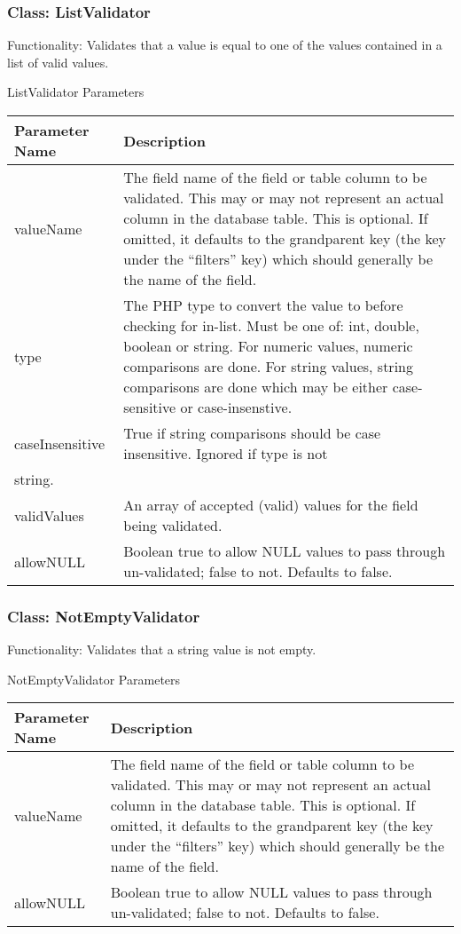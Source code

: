 \documentclass[letterpaper,10pt,english]{sphinxmanual}
\begin{document}
\subsubsection{Class: ListValidator}
\label{jaxFrameworkGuide:class-listvalidator}
Functionality: Validates that a value is equal to one of the values contained in a list of valid
values.

ListValidator Parameters

\begin{tabulary}{\linewidth}{|L|L|}
\hline
\textsf{\relax 
Parameter Name
} & \textsf{\relax 
Description
}\\
\hline
valueName
 & 
The field name of the field or table column to be validated.  This may or may not
represent an actual column in the database table.  This is optional.  If omitted, it
defaults to the grandparent key (the key under the ``filters'' key) which should
generally be the name of the field.
\\
\hline
type
 & 
The PHP type to convert the value to before checking for in-list.  Must be one of:
int, double, boolean or string.  For numeric values, numeric comparisons are done.
For string values, string comparisons are done which may be either case-sensitive or
case-insenstive.
\\
\hline
caseInsensitive
 & 
True if string comparisons should be case insensitive.  Ignored if type is not
\\
\hline
string.
 & \\
\hline
validValues
 & 
An array of accepted (valid) values for the field being validated.
\\
\hline
allowNULL
 & 
Boolean true to allow NULL values to pass through un-validated; false to not.
Defaults to false.
\\
\hline\end{tabulary}



\subsubsection{Class: NotEmptyValidator}
\label{jaxFrameworkGuide:class-notemptyvalidator}
Functionality: Validates that a string value is not empty.

NotEmptyValidator Parameters

\begin{tabulary}{\linewidth}{|L|L|}
\hline
\textsf{\relax 
Parameter Name
} & \textsf{\relax 
Description
}\\
\hline
valueName
 & 
The field name of the field or table column to be validated.  This may or may not
represent an actual column in the database table.  This is optional.  If omitted, it
defaults to the grandparent key (the key under the ``filters'' key) which should
generally be the name of the field.
\\
\hline
allowNULL
 & 
Boolean true to allow NULL values to pass through un-validated; false to not.
Defaults to false.
\\
\hline\end{tabulary}
\end{document}

